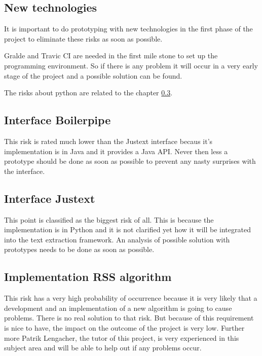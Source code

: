 \subsection{New technologies}

It is important to do prototyping with new technologies in the first phase of the project to eliminate these risks as soon as possible.

Gralde and Travic CI are needed in the first mile stone to set up the programming environment. So if there is any problem it will occur in a very early stage of the project and a possible solution can be found.

The risks about python are related to the chapter \ref{subsec:Interface Justext}.

\subsection{Interface Boilerpipe}

This risk is rated much lower than the Justext interface becaus it's implementation is in Java and it provides a Java API. Never then less a prototype should be done as soon as possible to prevent any nasty surprises with the interface.

\subsection{Interface Justext}
\label{subsec:Interface Justext}

This point is classified as the biggest risk of all. This is because the implementation is in Python and it is not clarified yet how it will be integrated into the text extraction framework. An analysis of possible solution with prototypes needs to be done as soon as possible.


\subsection{Implementation RSS algorithm}

This risk has a very high probability of occurrence because it is very likely that a development and an implementation of a new algorithm is going to cause problems. There is no real solution to that risk. But because of this requirement is nice to have, the impact on the outcome of the project is very low. Further more Patrik Lengacher, the tutor of this project, is very experienced in this subject area and will be able to help out if any problems occur. 